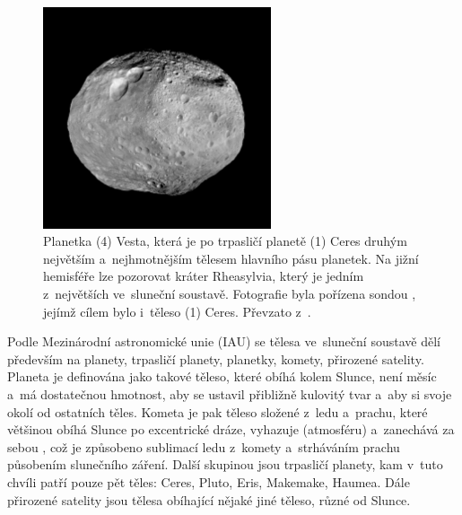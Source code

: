 \documentclass[A4paper, 12pt, oneside, openany]{book}
\begin{document}
\begin{figure}[!htb]
	\centering
	\includegraphics[width=0.6\textwidth]{obr/vesta.jpg}
	\caption{Planetka (4) Vesta, která je po trpasličí planetě (1) Ceres druhým největším a~nejhmotnějším tělesem hlavního pásu planetek. Na jižní hemisféře lze pozorovat kráter Rheasylvia, který je jedním z~největších ve~sluneční soustavě. Fotografie byla pořízena sondou , jejímž cílem bylo i~těleso (1) Ceres. Převzato z~\cite{jplvesta}.} \label{fig:vesta}
\end{figure}

Podle Mezinárodní astronomické unie (IAU) se tělesa ve~sluneční soustavě dělí především na planety, trpasličí planety, planetky, komety, přirozené satelity. Planeta je definována jako takové těleso, které obíhá kolem Slunce, není měsíc a~má dostatečnou hmotnost, aby se ustavil přibližně kulovitý tvar a~aby si  svoje okolí od ostatních těles. Kometa je pak těleso složené z~ledu a~prachu, které většinou obíhá Slunce po excentrické dráze, vyhazuje  (atmosféru) a~zanechává za sebou , což je způsobeno sublimací ledu z~komety a~strháváním prachu působením slunečního záření. Další skupinou jsou trpasličí planety, kam v~tuto chvíli patří pouze pět těles: Ceres, Pluto, Eris, Makemake, Haumea. Dále přirozené satelity jsou tělesa obíhající nějaké jiné těleso, různé od Slunce.
\end{document}
